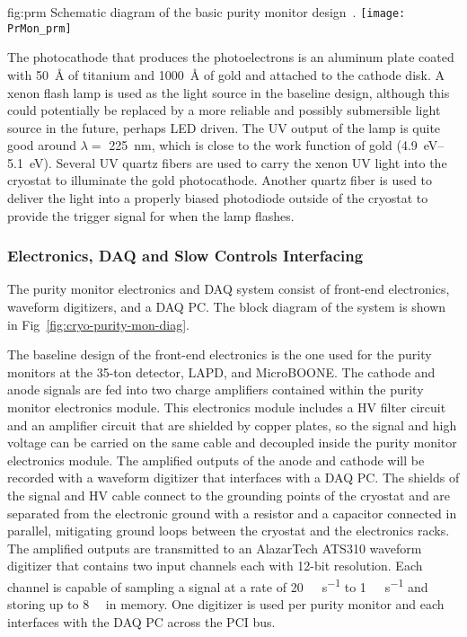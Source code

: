 \begin{dunefigure}{fig:prm}
  {Schematic diagram of the basic purity monitor design~\cite{Adamowski:2014daa}.}
  \texttt{[image: PrMon\_prm]}
\end{dunefigure}

The photocathode that produces the photoelectrons is an aluminum plate coated with \SI{50}{\angstrom} of titanium and \SI{1000}{\angstrom} of gold and attached to the cathode disk. A xenon flash lamp is used as the light source in the baseline design, although this could potentially be replaced by a more reliable and possibly submersible light source in the future, perhaps LED driven. The UV output of the lamp is quite good around $\lambda=$ \SI{225}{\nano\meter}, which is close to the work function of gold (\SIrange{4.9}{5.1}{\eV}). Several UV quartz fibers are used to carry the xenon UV light into the cryostat to illuminate the gold photocathode.   Another quartz fiber is used to deliver the light into a properly biased photodiode outside of the cryostat to provide the trigger signal for when the lamp flashes. 

\subsubsection{Electronics, DAQ and Slow Controls Interfacing}
The purity monitor electronics and DAQ system consist of front-end electronics, waveform digitizers, and a DAQ PC.  The block diagram of the system is shown in Fig~\ref{fig:cryo-purity-mon-diag}. 

The baseline design of the front-end electronics is the one used for the purity monitors at the 35-ton detector, LAPD, and MicroBOONE. The cathode and anode signals are fed into two charge amplifiers contained within the purity monitor electronics module. This electronics module includes a HV filter circuit and an amplifier circuit that are shielded by copper plates, so the signal and high voltage can be carried on the same cable and decoupled inside the purity monitor electronics module. The amplified outputs of the anode and cathode will be recorded with a waveform digitizer that interfaces with a DAQ PC. The shields of the signal and HV cable connect to the grounding points of the cryostat and are separated from the electronic ground with a resistor and a capacitor connected in parallel, mitigating ground loops between the cryostat and the electronics racks. The amplified outputs are transmitted to an AlazarTech ATS310 waveform digitizer that contains two input channels each with 12-bit resolution. Each channel is capable of sampling a signal at a rate of \SI{20}{\mega\samples\per\second} to \SI{1}{\kilo\samples\per\second} and storing up to \SI{8}{\mega\samples} in memory. One digitizer is used per purity monitor and each interfaces with the DAQ PC across the PCI bus. 

